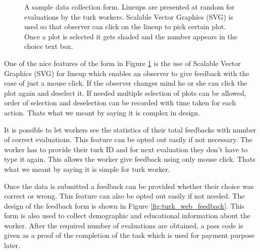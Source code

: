 \documentclass[11pt]{article}
\begin{document}
\begin{figure}[hbtp]
   \centering
       \caption{A sample data collection form. Lineups are presented at random for evaluations by the turk workers. Scalable Vector Graphics (SVG) is used so that observer can click on the lineup to pick certain plot. Once a plot is selected it gets shaded and the number appears in the choice text box.}
       \label{fig:turk_web}
\end{figure}

One of the nice features of the form in Figure \ref{fig:turk_web} is the use of Scalable Vector Graphics (SVG) for lineup which enables an observer to give feedback with the ease of just a mouse click. If the observer changes mind he or she can click the plot again and deselect it. If needed multiple selection of plots can be allowed, order of selection and deselection can be recorded with time taken for each action. Thats what we meant by saying it is complex in design. 

It is possible to let workers see the statistics of their total feedbacks with number of correct evaluations. This feature can be opted out easily if not necessary. The worker has to provide their turk ID and for next evaluation they don't have to type it again. This allows the worker give feedback using only mouse click. Thats what we meant by saying it is simple for turk worker.

Once the data is submitted a feedback can be provided whether their choice was correct or wrong. This feature can also be opted out easily if not needed. The design of the feedback form is shown in Figure \ref{fig:turk_web_feedback}. This form is also used to collect demographic and educational information about the worker. After the required number of evaluations are obtained, a pass code is given as a proof of the completion of the task which is used for payment purpose later.
\end{document}
